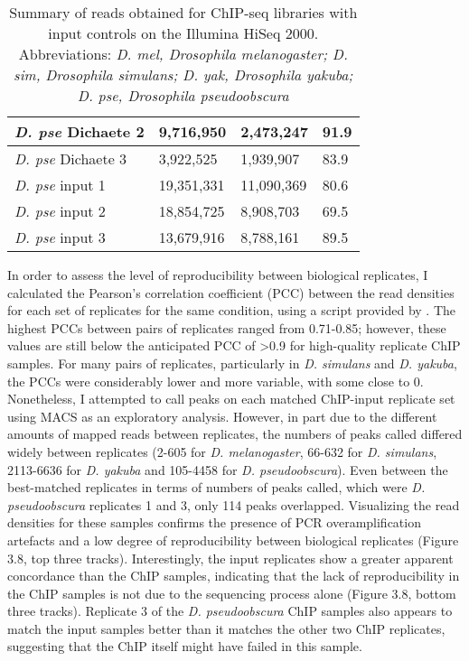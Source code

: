 \begin{table}[h]
\begin{tabular}{|l|l|l|l|}
\emph{D. pse} Dichaete 2 & 9,716,950   & 2,473,247    & 91.9               \\ \hline
\emph{D. pse} Dichaete 3 & 3,922,525   & 1,939,907    & 83.9               \\ \hline
\emph{D. pse} input 1    & 19,351,331  & 11,090,369   & 80.6               \\ \hline
\emph{D. pse} input 2    & 18,854,725  & 8,908,703    & 69.5               \\ \hline
\emph{D. pse} input 3    & 13,679,916  & 8,788,161    & 89.5               \\ \hline
\end{tabular}
\caption{Summary of reads obtained for ChIP-seq libraries with input controls on the Illumina HiSeq 2000. Abbreviations: \emph{D. mel, Drosophila melanogaster; D. sim, Drosophila simulans; D. yak, Drosophila yakuba; D. pse, Drosophila pseudoobscura}}
\label{Table 3.3}
\end{table}

In order to assess the level of reproducibility between biological replicates, I calculated the Pearson's correlation coefficient (PCC) between the read densities for each set of replicates for the same condition, using a script provided by \citet{bardet_computational_2011}. The highest PCCs between pairs of replicates ranged from 0.71-0.85; however, these values are still below the anticipated PCC of \textgreater 0.9 for high-quality replicate ChIP samples. For many pairs of replicates, particularly in \emph{D. simulans} and \emph{D. yakuba}, the PCCs were considerably lower and more variable, with some close to 0. Nonetheless, I attempted to call peaks on each matched ChIP-input replicate set using MACS as an exploratory analysis. However, in part due to the different amounts of mapped reads between replicates, the numbers of peaks called differed widely between replicates (2-605 for \emph{D. melanogaster}, 66-632 for \emph{D. simulans}, 2113-6636 for \emph{D. yakuba} and 105-4458 for \emph{D. pseudoobscura}). Even between the best-matched replicates in terms of numbers of peaks called, which were \emph{D. pseudoobscura} replicates 1 and 3, only 114 peaks overlapped. Visualizing the read densities for these samples confirms the presence of PCR overamplification artefacts and a low degree of reproducibility between biological replicates (Figure 3.8, top three tracks). Interestingly, the input replicates show a greater apparent concordance than the ChIP samples, indicating that the lack of reproducibility in the ChIP samples is not due to the sequencing process alone (Figure 3.8, bottom three tracks). Replicate 3 of the \emph{D. pseudoobscura} ChIP samples also appears to match the input samples better than it matches the other two ChIP replicates, suggesting that the ChIP itself might have failed in this sample.

